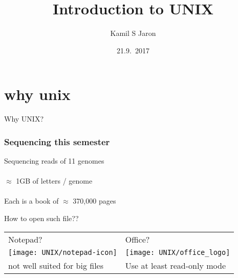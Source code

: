 \documentclass[xcolor=dvipsnames]{beamer}
\title[ ]{Introduction to UNIX}
\author{Kamil S Jaron}
\date{21.9.~2017}
\begin{document}
\Large
\begin{frame}
	\titlepage
\end{frame}


\section{why unix}

\begin{frame}
	\Huge
	\begin{center}
		Why UNIX?
	\end{center}
\end{frame}

\begin{frame}
	\frametitle{Sequencing this semester}
	\LARGE
	\begin{center}
	Sequencing reads of 11 genomes \\
	~\\
	\pause
	$\approx$ 1GB of letters / genome \\
	~\\
	Each is a book of $\approx$ 370,000 pages
	\end{center}
\end{frame}

\begin{frame}
	\begin{center}
	\huge
	How to open such file?? \\
	\vspace{1cm}

	\Large
	\begin{tabular}{C{0.4\textwidth}C{0.4\textwidth}}
	Notepad? & Office? \\
	\texttt{[image: UNIX/notepad-icon]} & \texttt{[image: UNIX/office\_logo]} \\
	\small not well suited for big files & \small Use at least read-only mode\\
	\end{tabular}
	\end{center}
\end{frame}
\end{document}
